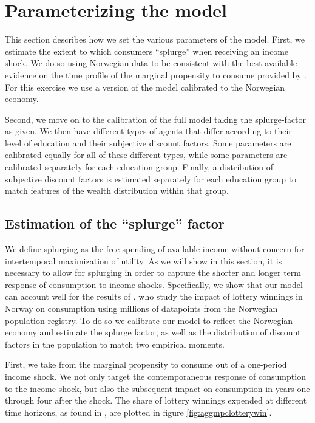 \documentclass[11pt]{article}
\begin{document}
\section{Parameterizing the model}

This section describes how we set the various parameters of the model. First, we estimate the extent to which consumers ``splurge'' when receiving an income shock. We do so using Norwegian data to be consistent with the best available evidence on the time profile of the marginal propensity to consume provided by \citet{fagereng_mpc_2021}. For this exercise we use a version of the model calibrated to the Norwegian economy. 

Second, we move on to the calibration of the full model taking the splurge-factor as given. We then have different types of agents that differ according to their level of education and their subjective discount factors. Some parameters are calibrated equally for all of these different types, while some parameters are calibrated separately for each education group. Finally, a distribution of subjective discount factors is estimated separately for each education group to match features of the wealth distribution within that group. 

\subsection{Estimation of the ``splurge'' factor}

We define splurging as the free spending of available income without concern for intertemporal maximization of utility. As we will show in this section, it is necessary to allow for splurging in order to capture the shorter and longer term response of consumption to income shocks. Specifically, we show that our model can account well for the results of \citet{fagereng_mpc_2021}, who study the impact of lottery winnings in Norway on consumption using millions of datapoints from the Norwegian population registry. To do so we calibrate our model to reflect the Norwegian economy and estimate the splurge factor, as well as the distribution of discount factors in the population to match two empirical moments. 

First, we take from \citet{fagereng_mpc_2021} the marginal propensity to consume out of a one-period income shock. We not only target the contemporaneous response of consumption to the income shock, but also the subsequent impact on consumption in years one through four after the shock. The share of lottery winnings expended at different time horizons, as found in \citet{fagereng_mpc_2021}, are plotted in figure \ref{fig:aggmpclotterywin}.
	
\end{document}

